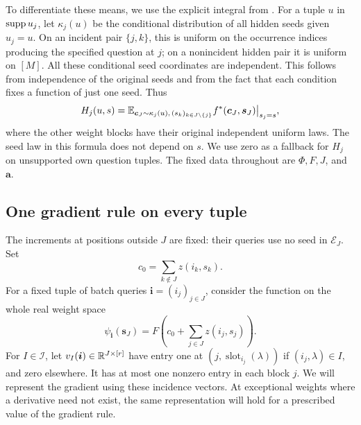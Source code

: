 To differentiate these means, we use the explicit integral from
. For a tuple \(u\) in
\(\operatorname{supp} u_j\), let \(\kappa_j(u)\) be the conditional distribution of
all hidden seeds given \(u_j=u\). On an incident pair
\(\{j,k\}\), this is uniform on the occurrence indices producing
the specified question at \(j\); on a nonincident hidden pair it
is uniform on \([M]\). All these conditional seed coordinates are
independent. This follows from independence of the original seeds
and from the fact that each condition fixes a function of just one
seed. Thus
\begin{equation}
 H_j(u,s)=
  \mathbb E_{\boldsymbol c_J\sim\kappa_j(u),\,(s_k)_{k\in J\setminus\{j\}}}
            f^*(\boldsymbol c_J,\boldsymbol s_J)
               \big|_{s_j=s},
 \label{ana:own-mean}
\end{equation}
where the other weight blocks have their original independent
uniform laws. The seed law in this formula does not depend on
\(s\). We use zero as a fallback for \(H_j\) on unsupported own
question tuples. The fixed data throughout are \(\Phi,F,J\), and
\(\boldsymbol a\).

\subsection{One gradient rule on every tuple}

The increments at positions outside \(J\) are fixed: their queries
use no seed in \(\mathcal E_J\). Set
\[
 c_0=\sum_{k\notin J}z(i_k,s_k).
\]
For a fixed tuple of batch queries \(\boldsymbol i=(i_j)_{j\in J}\),
consider the function on the whole real weight space
\[
 \psi_{\boldsymbol i}(\boldsymbol s_J)
       =F\left(c_0+\sum_{j\in J}z(i_j,s_j)\right).
\]
For \(I\in\mathcal I\), let
\(v_I(\boldsymbol i)\in\mathbb R^{J\times[r]}\) have entry one at
\((j,\operatorname{slot}_{i_j}(\lambda))\) if
\((i_j,\lambda)\in I\), and zero elsewhere. It has at most one
nonzero entry in each block \(j\).
We will represent the gradient using these incidence vectors. At
exceptional weights where a derivative need not exist, the same
representation will hold for a prescribed value of the gradient rule.

